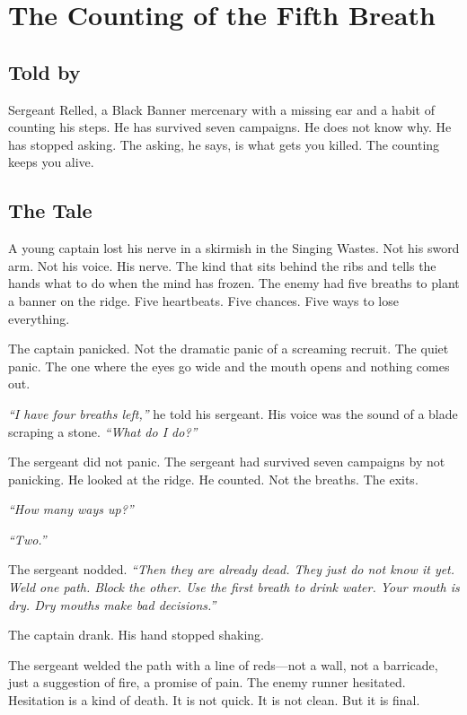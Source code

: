 \chapter{The Counting of the Fifth Breath}

\section*{Told by}
Sergeant Relled, a Black Banner mercenary with a missing ear and a habit of counting his steps. He has survived seven campaigns. He does not know why. He has stopped asking. The asking, he says, is what gets you killed. The counting keeps you alive.

\section*{The Tale}

A young captain lost his nerve in a skirmish in the Singing Wastes. Not his sword arm. Not his voice. His nerve. The kind that sits behind the ribs and tells the hands what to do when the mind has frozen. The enemy had five breaths to plant a banner on the ridge. Five heartbeats. Five chances. Five ways to lose everything.

The captain panicked. Not the dramatic panic of a screaming recruit. The quiet panic. The one where the eyes go wide and the mouth opens and nothing comes out.

\textit{``I have four breaths left,''} he told his sergeant. His voice was the sound of a blade scraping a stone. \textit{``What do I do?''}

The sergeant did not panic. The sergeant had survived seven campaigns by not panicking. He looked at the ridge. He counted. Not the breaths. The exits.

\textit{``How many ways up?''}

\textit{``Two.''}

The sergeant nodded. \textit{``Then they are already dead. They just do not know it yet. Weld one path. Block the other. Use the first breath to drink water. Your mouth is dry. Dry mouths make bad decisions.''}

The captain drank. His hand stopped shaking.

The sergeant welded the path with a line of reds---not a wall, not a barricade, just a suggestion of fire, a promise of pain. The enemy runner hesitated. Hesitation is a kind of death. It is not quick. It is not clean. But it is final.


